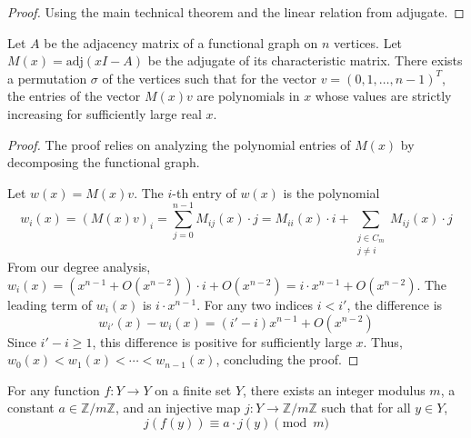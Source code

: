 \begin{proof}
Using the main technical theorem and the linear relation from adjugate.
\end{proof}


\begin{theorem} 
\label{thm:main_technical_theorem}
Let $A$ be the adjacency matrix of a functional graph on $n$ vertices. Let $M(x) = \text{adj}(xI - A)$ be the adjugate of its characteristic matrix. There exists a permutation $\sigma$ of the vertices such that for the vector $v = (0, 1, \ldots, n-1)^T$, the entries of the vector $M(x)v$ are polynomials in $x$ whose values are strictly increasing for sufficiently large real $x$.
\end{theorem}

\begin{proof}
The proof relies on analyzing the polynomial entries of $M(x)$ by decomposing the functional graph.

Let $w(x) = M(x)v$. The $i$-th entry of $w(x)$ is the polynomial
\[
w_i(x) = (M(x)v)_i = \sum_{j=0}^{n-1} M_{ij}(x) \cdot j = M_{ii}(x) \cdot i + \sum_{\substack{j \in C_m \\ j \neq i}} M_{ij}(x) \cdot j
\]
From our degree analysis, $w_i(x) = (x^{n-1} + O(x^{n-2})) \cdot i + O(x^{n-2}) = i \cdot x^{n-1} + O(x^{n-2})$. The leading term of $w_i(x)$ is $i \cdot x^{n-1}$. For any two indices $i < i'$, the difference is
\[
w_{i'}(x) - w_i(x) = (i' - i)x^{n-1} + O(x^{n-2})
\]
Since $i' - i \geq 1$, this difference is positive for sufficiently large $x$. Thus, $w_0(x) < w_1(x) < \cdots < w_{n-1}(x)$, concluding the proof.
\end{proof}

\begin{corollary} 
\label{cor:linear_representation_corollary}
For any function $f: Y \to Y$ on a finite set $Y$, there exists an integer modulus $m$, a constant $a \in \mathbb{Z}/m\mathbb{Z}$, and an injective map $j: Y \to \mathbb{Z}/m\mathbb{Z}$ such that for all $y \in Y$,
$$j(f(y)) \equiv a \cdot j(y) \pmod{m}$$
\end{corollary}

